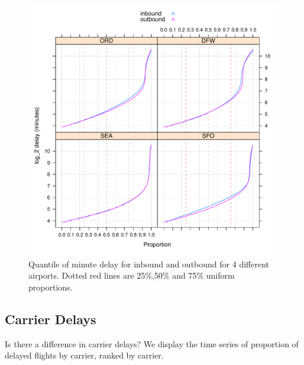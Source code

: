 \documentclass[letterpaper,10pt,english]{sphinxmanual}
\begin{document}
\label{airline:quantilebyairport}\begin{figure}[htbp]
\centering

\includegraphics{quantiles_by_airport.pdf}
\caption{Quantile of minute delay for inbound and outbound for 4 different
airports. Dotted red lines are 25\%,50\% and 75\% uniform proportions.}\end{figure}


\subsection{Carrier Delays}
\label{airline:carrier-delays}
Is there a difference in carrier delays? We display the time series of
proportion of delayed flights by carrier, ranked by carrier.
\end{document}
